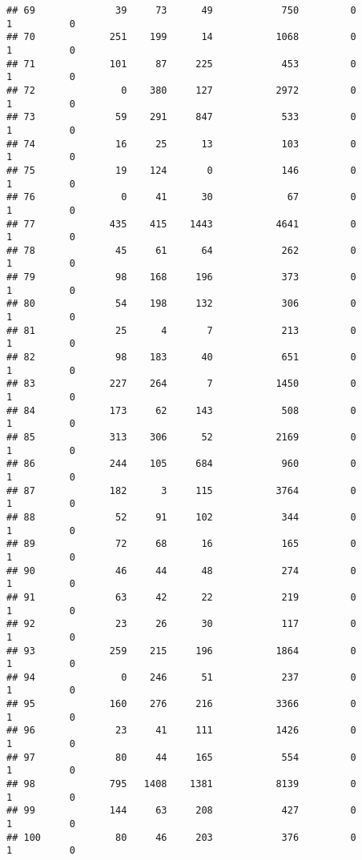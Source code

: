 \documentclass[
]{article}
\begin{document}
\begin{verbatim}
## 69              39     73      49            750         0         1          0
## 70             251    199      14           1068         0         1          0
## 71             101     87     225            453         0         1          0
## 72               0    380     127           2972         0         1          0
## 73              59    291     847            533         0         1          0
## 74              16     25      13            103         0         1          0
## 75              19    124       0            146         0         1          0
## 76               0     41      30             67         0         1          0
## 77             435    415    1443           4641         0         1          0
## 78              45     61      64            262         0         1          0
## 79              98    168     196            373         0         1          0
## 80              54    198     132            306         0         1          0
## 81              25      4       7            213         0         1          0
## 82              98    183      40            651         0         1          0
## 83             227    264       7           1450         0         1          0
## 84             173     62     143            508         0         1          0
## 85             313    306      52           2169         0         1          0
## 86             244    105     684            960         0         1          0
## 87             182      3     115           3764         0         1          0
## 88              52     91     102            344         0         1          0
## 89              72     68      16            165         0         1          0
## 90              46     44      48            274         0         1          0
## 91              63     42      22            219         0         1          0
## 92              23     26      30            117         0         1          0
## 93             259    215     196           1864         0         1          0
## 94               0    246      51            237         0         1          0
## 95             160    276     216           3366         0         1          0
## 96              23     41     111           1426         0         1          0
## 97              80     44     165            554         0         1          0
## 98             795   1408    1381           8139         0         1          0
## 99             144     63     208            427         0         1          0
## 100             80     46     203            376         0         1          0

\end{verbatim}
\end{document}
